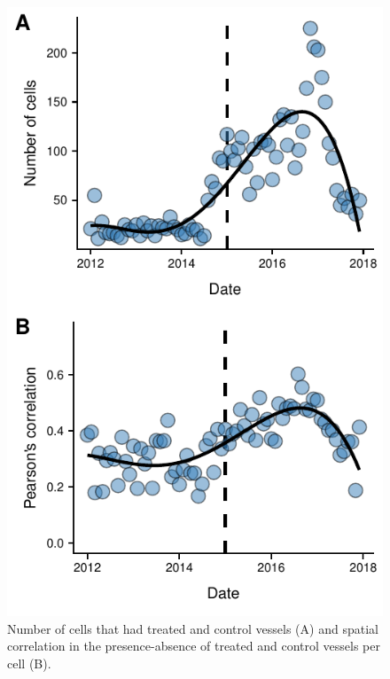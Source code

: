 \documentclass[9p,twocolumn,twoside,lineno]{pnas-new}
\begin{document}
\clearpage





\clearpage

\begin{figure}
\centering
\includegraphics{img/sp_corr.pdf}
\caption{\label{fig:sp_corr}Number of cells that
had treated and control vessels (A) and spatial correlation in the
presence-absence of treated and control vessels per cell (B).}
\end{figure}


\end{document}

